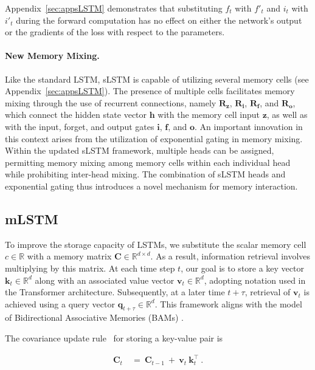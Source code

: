 Appendix~\ref{sec:appsLSTM} demonstrates that substituting $f_t$ with $f'_t$ and $i_t$ with $i'_t$ during the forward computation has no effect on either the network’s output or the gradients of the loss with respect to the parameters.

\paragraph{New Memory Mixing.} Like the standard LSTM, sLSTM is capable of utilizing several memory cells (see Appendix~\ref{sec:appsLSTM}). The presence of multiple cells facilitates memory mixing through the use of recurrent connections, namely $\mathbf{R}_{\mathbf{z}}$, $\mathbf{R}_{\mathbf{i}}$, $\mathbf{R}_{\mathbf{f}}$, and $\mathbf{R}_{\mathbf{o}}$, which connect the hidden state vector $\mathbf{h}$ with the memory cell input $\mathbf{z}$, as well as with the input, forget, and output gates $\mathbf{i}$, $\mathbf{f}$, and $\mathbf{o}$. An important innovation in this context arises from the utilization of exponential gating in memory mixing. Within the updated sLSTM framework, multiple heads can be assigned, permitting memory mixing among memory cells within each individual head while prohibiting inter-head mixing. The combination of sLSTM heads and exponential gating thus introduces a novel mechanism for memory interaction.

\subsection{mLSTM}
\label{sec:mLSTM}

To improve the storage capacity of LSTMs, we substitute the scalar memory cell $c \in \mathbb{R}$ with a memory matrix $\mathbf{C} \in \mathbb{R}^{d \times d}$. As a result, information retrieval involves multiplying by this matrix. At each time step $t$, our goal is to store a key vector $\mathbf{k}_t \in \mathbb{R}^d$ along with an associated value vector $\mathbf{v}_t \in \mathbb{R}^d$, adopting notation used in the Transformer architecture. Subsequently, at a later time $t + \tau$, retrieval of $\mathbf{v}_t$ is achieved using a query vector $\mathbf{q}_{t+\tau} \in \mathbb{R}^d$. This framework aligns with the model of Bidirectional Associative Memories (BAMs) \citep{Kohonen:72,Anderson:72,Nakano:72,Anderson:77}.

The covariance update rule~\citep{Sejnowski:77,Dayan:91} for storing a key-value pair is

\begin{align}
\mathbf{C}_t \ &= \ \mathbf{C}_{t-1} \ + \ \mathbf{v}_{t} \ \mathbf{k}_t^\top \ .
\end{align}


